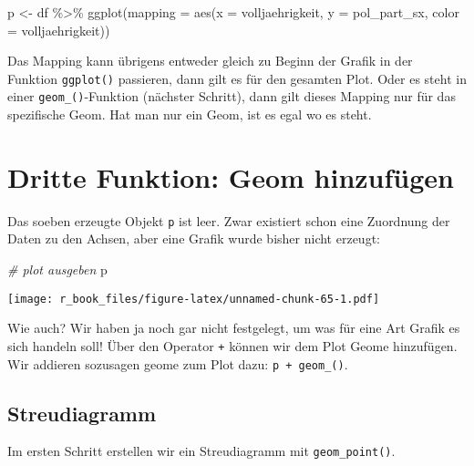 \documentclass[
]{book}
\newenvironment{Shaded}{\begin{snugshade}}{\end{snugshade}}
\newcommand{\AttributeTok}[1]{\textcolor[rgb]{0.77,0.63,0.00}{#1}}
\newcommand{\CommentTok}[1]{\textcolor[rgb]{0.56,0.35,0.01}{\textit{#1}}}
\newcommand{\FunctionTok}[1]{\textcolor[rgb]{0.00,0.00,0.00}{#1}}
\newcommand{\NormalTok}[1]{#1}
\newcommand{\OtherTok}[1]{\textcolor[rgb]{0.56,0.35,0.01}{#1}}
\newcommand{\SpecialCharTok}[1]{\textcolor[rgb]{0.00,0.00,0.00}{#1}}
\begin{document}
\begin{Shaded}
\begin{Highlighting}[]
\NormalTok{p }\OtherTok{\textless{}{-}}\NormalTok{ df }\SpecialCharTok{\%\textgreater{}\%} 
  \FunctionTok{ggplot}\NormalTok{(}\AttributeTok{mapping =} \FunctionTok{aes}\NormalTok{(}\AttributeTok{x =}\NormalTok{ volljaehrigkeit,}
                       \AttributeTok{y =}\NormalTok{ pol\_part\_sx, }
                       \AttributeTok{color =}\NormalTok{ volljaehrigkeit))}
\end{Highlighting}
\end{Shaded}

Das Mapping kann übrigens entweder gleich zu Beginn der Grafik in der Funktion \texttt{ggplot()} passieren, dann gilt es für den gesamten Plot. Oder es steht in einer \texttt{geom\_()}-Funktion (nächster Schritt), dann gilt dieses Mapping nur für das spezifische Geom. Hat man nur ein Geom, ist es egal wo es steht.

\hypertarget{dritte-funktion-geom-hinzufuxfcgen}{%
\section{Dritte Funktion: Geom hinzufügen}\label{dritte-funktion-geom-hinzufuxfcgen}}

Das soeben erzeugte Objekt \texttt{p} ist leer. Zwar existiert schon eine Zuordnung der Daten zu den Achsen, aber eine Grafik wurde bisher nicht erzeugt:

\begin{Shaded}
\begin{Highlighting}[]
\CommentTok{\# plot ausgeben}
\NormalTok{p }
\end{Highlighting}
\end{Shaded}

\texttt{[image: r\_book\_files/figure-latex/unnamed-chunk-65-1.pdf]}

Wie auch? Wir haben ja noch gar nicht festgelegt, um was für eine Art Grafik es sich handeln soll! Über den Operator \texttt{+} können wir dem Plot Geome hinzufügen. Wir addieren sozusagen geome zum Plot dazu: \texttt{p\ +\ geom\_()}.

\hypertarget{streudiagramm-1}{%
\subsection{Streudiagramm}\label{streudiagramm-1}}

Im ersten Schritt erstellen wir ein Streudiagramm mit \texttt{geom\_point()}.
\end{document}
